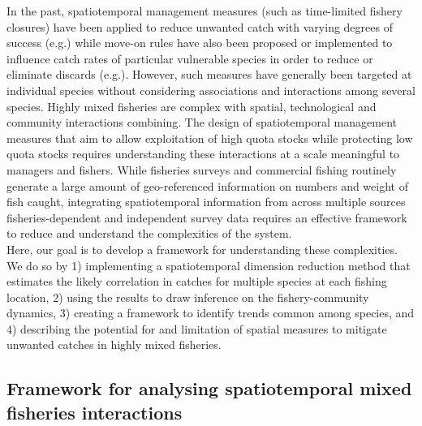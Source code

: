 \documentclass[fleqn,10pt]{wlscirep}
\begin{document}
\begin{linenumbers}
In the past, spatiotemporal management measures (such as time-limited fishery
closures) have been applied to reduce unwanted catch with varying degrees of
success (e.g.\cite{Needle2011, Holmes2011, Beare2010, Dinmore2003}) while
move-on rules have also been proposed or implemented to influence catch rates
of particular vulnerable species in order to reduce or eliminate discards
(e.g.\cite{Gardner2008, Dunn2011, Dunn2014a}).  However, such measures have
generally been targeted at individual species without considering associations
and interactions among several species. Highly mixed fisheries are complex with
spatial, technological and community interactions combining. The design of
spatiotemporal management measures that aim to allow exploitation of high quota
stocks while protecting low quota stocks requires understanding these
interactions at a scale meaningful to managers and fishers. While fisheries
surveys and commercial fishing routinely generate a large amount of
geo-referenced information on numbers and weight of fish caught, integrating
spatiotemporal information from across multiple sources fisheries-dependent and
independent survey data requires an effective framework to reduce and
understand the complexities of the system. \\

Here, our goal is to develop a framework for understanding these complexities.
We do so by 1) implementing a spatiotemporal dimension reduction method that
estimates the likely correlation in catches for multiple species at each
fishing location, 2) using the results to draw inference on the
fishery-community dynamics, 3) creating a framework to identify trends common
among species, and 4) describing the potential for and limitation of spatial
measures to mitigate unwanted catches in highly mixed fisheries.\\

\subsection*{Framework for analysing spatiotemporal mixed fisheries
	interactions \\}


\end{linenumbers}
\end{document}
